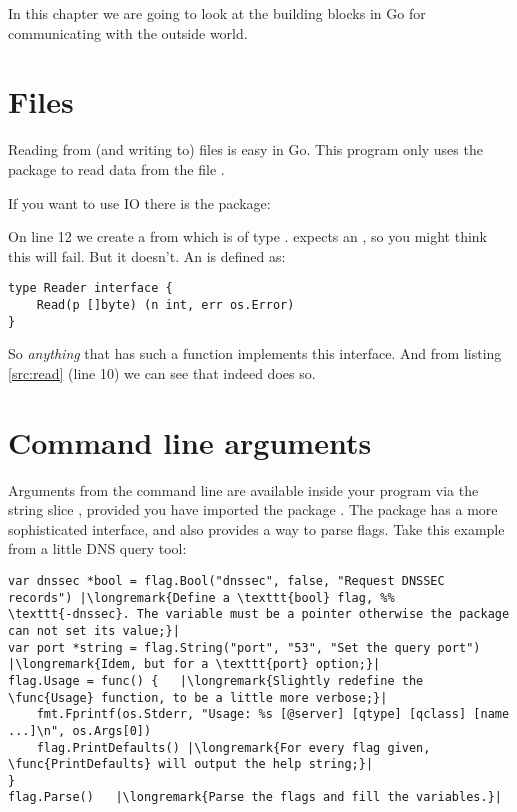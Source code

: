 \noindent{}In this chapter we are going to look at the building blocks in Go for 
communicating with the outside world.

\section{Files}
Reading from (and writing to) files is easy in Go. This program
only uses the  package to read data from the file .

If you want to use  IO there is the
 package:


On line 12 we create a  from  which is of
type .  expects an , so you
might think this will fail. But it doesn't. An  is
defined as:
\begin{lstlisting}
type Reader interface {
    Read(p []byte) (n int, err os.Error)
}
\end{lstlisting}
So \emph{anything} that has such a  function implements this
interface. And from listing \ref{src:read} (line 10) we can see
that  indeed does so. 

\section{Command line arguments}
\label{sec:option parsing}
Arguments from the command line are available inside your program via
the string slice , provided you have imported the package
. The  package has a more sophisticated
interface, and also provides a way to parse flags. Take this example
from a little DNS query tool:
\begin{lstlisting}
var dnssec *bool = flag.Bool("dnssec", false, "Request DNSSEC records") |\longremark{Define a \texttt{bool} flag, %%
\texttt{-dnssec}. The variable must be a pointer otherwise the package can not set its value;}|
var port *string = flag.String("port", "53", "Set the query port")      |\longremark{Idem, but for a \texttt{port} option;}|
flag.Usage = func() {   |\longremark{Slightly redefine the \func{Usage} function, to be a little more verbose;}|
    fmt.Fprintf(os.Stderr, "Usage: %s [@server] [qtype] [qclass] [name ...]\n", os.Args[0])
    flag.PrintDefaults() |\longremark{For every flag given, \func{PrintDefaults} will output the help string;}|
}
flag.Parse()   |\longremark{Parse the flags and fill the variables.}|
\end{lstlisting}
\showremarks


